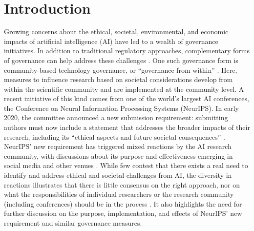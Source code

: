 \documentclass[11pt,english]{article}
\begin{document}
	\section*{Introduction}
	Growing concerns about the ethical, societal, environmental, and economic impacts of artificial intelligence (AI) have led to a wealth of governance initiatives. In addition to traditional regulatory approaches, complementary forms of governance can help address these challenges \citep{winfield_ethical_2018}. One such governance form is community-based technology governance, or ``governance from within'' \citep{fisher_midstream_2006}. Here, measures to influence research based on societal considerations develop from within the scientific community and are  implemented at the community level. A recent initiative of this kind comes from one of the world's largest AI conferences, the Conference on Neural Information Processing Systems (NeurIPS). In early 2020, the committee announced a new submission requirement: submitting authors must now include a statement that addresses the broader impacts of their research, including its ``ethical aspects and future societal consequences'' \citep{neurips_call_2020}. NeurIPS' new requirement has triggered mixed reactions by the AI research community, with discussions about its purpose and effectiveness emerging in social media and other venues \citep{johnson_neurips_2020}. While few contest that there exists a real need to identify and address ethical and societal challenges from AI, the diversity in reactions illustrates that there is little consensus on the right approach, nor on what the responsibilities of individual researchers or the research community (including conferences) should be in the process \citep{brundage_artificial_2016,hecht_its_2018}. It also highlights the need for further discussion on the purpose, implementation, and effects of NeurIPS' new requirement and similar governance measures.
	
\end{document}

